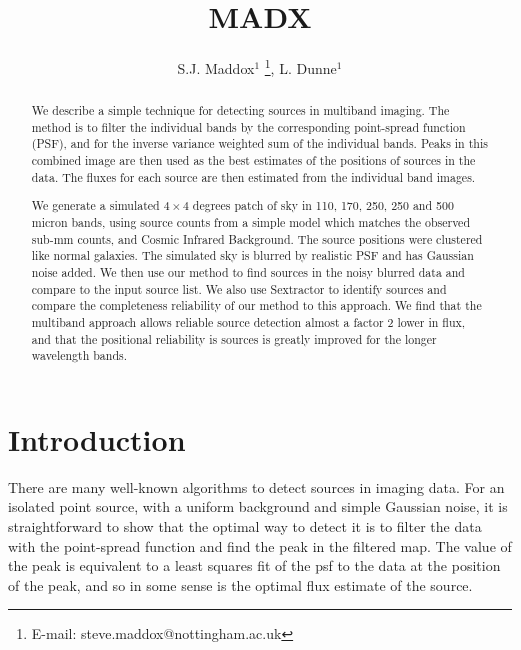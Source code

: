 \documentclass[useAMS,usenatbib]{mn2e}
\title[MADX - A simple technique for source detection in multiband imaging]{MADX}
\author[S.J. Maddox]{\parbox{\textwidth}{S.J. Maddox$^{1}$
\thanks{E-mail: steve.maddox@nottingham.ac.uk}, L. Dunne$^{1}$}}
\begin{document}
\date{}

\pagerange{\pageref{firstpage}--\pageref{lastpage}} 

\maketitle

\label{firstpage}

\begin{abstract}
We describe a simple technique for detecting sources in multiband
imaging. The method is to filter the individual bands by the
corresponding point-spread function (PSF), and for the inverse
variance weighted sum of the individual bands. Peaks in this combined
image are then used as the best estimates of the positions of sources
in the data. The fluxes for each source are then estimated from the
individual band images.

We generate a simulated $4\times 4$ degrees patch of sky in 110, 170,
250, 250 and 500 micron bands, using source counts from a simple model
which matches the observed sub-mm counts, and Cosmic Infrared
Background. The source positions were clustered like normal
galaxies. The simulated sky is blurred by realistic PSF and has
Gaussian noise added. We then use our method to find sources in the
noisy blurred data and compare to the input source list.  We also use
Sextractor to identify sources and compare the completeness
reliability of our method to this approach.  We find that the
multiband approach allows reliable source detection almost a factor 2
lower in flux, and that the positional reliability is sources is
greatly improved for the longer wavelength bands.




\end{abstract}

\begin{keywords}

\end{keywords}

\section{Introduction}

There are many well-known algorithms to detect sources in imaging
data. For an isolated point source, with a uniform background and
simple Gaussian noise, it is straightforward to show that the optimal
way to detect it is to filter the data with the point-spread function
and find the peak in the filtered map. The value of the peak is
equivalent to a least squares fit of the psf to the data at the
position of the peak, and so in some sense is the optimal flux
estimate of the source.
\end{document}
